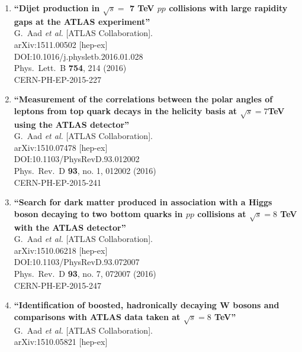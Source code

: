 \documentclass{article}
\begin{document}
\begin{enumerate}
\item%
{\bf ``Dijet production in $\sqrt{s}=$ 7 TeV $pp$ collisions with large rapidity gaps at the ATLAS experiment''}
  \\{}G.~Aad {\it et al.} [ATLAS Collaboration].
  \\{}arXiv:1511.00502 [hep-ex]
  \\{}DOI:10.1016/j.physletb.2016.01.028
  \\{}Phys.\ Lett.\ B {\bf 754}, 214 (2016)
  \\{}CERN-PH-EP-2015-227
\item%
{\bf ``Measurement of the correlations between the polar angles of leptons from top quark decays in the helicity basis at $\sqrt{s}=7$TeV using the ATLAS detector''}
  \\{}G.~Aad {\it et al.} [ATLAS Collaboration].
  \\{}arXiv:1510.07478 [hep-ex]
  \\{}DOI:10.1103/PhysRevD.93.012002
  \\{}Phys.\ Rev.\ D {\bf 93}, no. 1, 012002 (2016)
  \\{}CERN-PH-EP-2015-241
\item%
{\bf ``Search for dark matter produced in association with a Higgs boson decaying to two bottom quarks in $pp$ collisions at $\sqrt{s} = 8$ TeV with the ATLAS detector''}
  \\{}G.~Aad {\it et al.} [ATLAS Collaboration].
  \\{}arXiv:1510.06218 [hep-ex]
  \\{}DOI:10.1103/PhysRevD.93.072007
  \\{}Phys.\ Rev.\ D {\bf 93}, no. 7, 072007 (2016)
  \\{}CERN-PH-EP-2015-247
\item%
{\bf ``Identification of boosted, hadronically decaying W bosons and comparisons with ATLAS data taken at $\sqrt{s} = 8$ TeV''}
  \\{}G.~Aad {\it et al.} [ATLAS Collaboration].
  \\{}arXiv:1510.05821 [hep-ex]

\end{enumerate}
\end{document}
